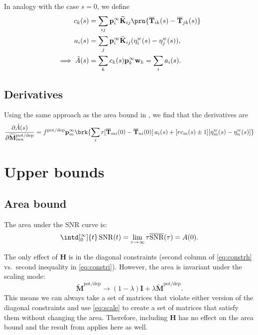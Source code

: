 \documentclass[12pt]{article}
\newcommand{\I}{\mathbf{I}}
\newcommand{\pr}{\mathbf{p}}
\newcommand{\eq}{\pr^\infty}
\newcommand{\fpt}{\mathbf{T}}
\newcommand{\fptb}{\overline{\fpt}}
\newcommand{\w}{\mathbf{w}}
\newcommand{\M}{\mathbf{M}}
\newcommand{\enc}{\mathbf{K}}
\newcommand{\potdep}{^{\text{pot/dep}}}
\renewcommand{\hom}{\mathbf{H}}
\newcommand{\Mh}{\widetilde{\M}}
\newcommand{\ench}{\widetilde{\enc}}
\DeclareMathOperator{\snr}{SNR}
\newcommand{\snrb}{\overline{\snr}}
\renewcommand{\pdiff}[2]{\frac{\partial #1}{\partial #2}}
\begin{document}
In analogy with the case $s=0$, we define
%
\begin{equation}\label{eq:lareacoeffs}
  \begin{aligned}
    c_k(s) &= \sum_{ij} \eq_i \ench_{ij} \prn{\fptb_{ik}(s)-\fptb_{jk}(s)} \\
    a_i(s) &= \sum_j \eq_i \ench_{ij} (\eta^w_{i}(s) - \eta^w_{j}(s)),\\
    \implies
    \hat{A}(s) &= \sum_k c_k(s) \eq_k \w_k
      = \sum_i a_i(s).
  \end{aligned}
\end{equation}
%

\subsection{Derivatives}\label{sec:lderiv}

Using the same approach as the area bound in \cite{Lahiri2013synapse}, we find that the derivatives are
%
\begin{equation}\label{eq:lAdiff}
  \pdiff{\hat{A}(s)}{\Mh\potdep_{mn}}
     = f\potdep \eq_m \brk{ \sum_i r[\fptb_{mi}(0)-\fptb_{ni}(0)]\, a_i(s)
     +[rc_m(s) \pm 1] [\eta^w_m(s) - \eta^w_n(s)] }
\end{equation}
%





\section{Upper bounds}\label{sec:upperbnds}



\subsection{Area bound}\label{sec:area}

The area under the SNR curve is:
%
\begin{equation}\label{eq:areadef}
  \intd[_0^\infty]{t} \snr(t) = \lim_{\tau\to\infty} \tau \snrb(\tau) = A(0).
\end{equation}
%

The only effect of $\hom$ is in the diagonal constraints (second column of \eqref{eq:constrh} vs.\ second inequality in \eqref{eq:constri}).
However, the area is invariant under the scaling mode:
%
\begin{equation}\label{eq:scale}
  \Mh\potdep  \to (1-\lambda)\I + \lambda \Mh\potdep .
\end{equation}
%
This means we can always take a set of matrices that violate either version of the diagonal constraints and use \eqref{eq:scale} to create a set of matrices that satisfy them without changing the area.
Therefore, including $\hom$ has no effect on the area bound and the result from \cite{Lahiri2013synapse} applies here as well.
\end{document}
